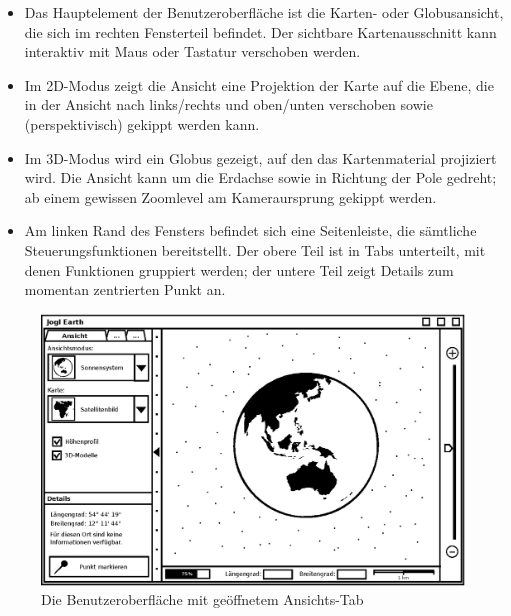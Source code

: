 \documentclass[10pt]{scrreprt}
\begin{document}
\begin{itemize}
	\item Das Hauptelement der Benutzeroberfläche ist die Karten- oder Globusansicht, die sich im rechten Fensterteil befindet. Der sichtbare Kartenausschnitt kann interaktiv mit Maus oder Tastatur verschoben werden.
	\item Im 2D-Modus zeigt die Ansicht eine Projektion der Karte auf die Ebene, die in der Ansicht nach links/rechts und oben/unten verschoben sowie (perspektivisch) gekippt werden kann.
	\item Im 3D-Modus wird ein Globus gezeigt, auf den das Kartenmaterial projiziert wird. Die Ansicht kann um die Erdachse sowie in Richtung der Pole gedreht; ab einem gewissen Zoomlevel am Kameraursprung gekippt werden.
	\item Am linken Rand des Fensters befindet sich eine Seitenleiste, die sämtliche Steuerungsfunktionen bereitstellt. Der obere Teil ist in Tabs unterteilt, mit denen Funktionen gruppiert werden; der untere Teil zeigt Details zum momentan zentrierten Punkt an.
\end{itemize}


\vspace{1cm}
\begin{figure}[h]
	\centering
	\includegraphics[scale=0.9]{GUI-Ansicht.eps}
	\caption{Die Benutzeroberfläche mit geöffnetem Ansichts-Tab}
\end{figure}
\end{document}
